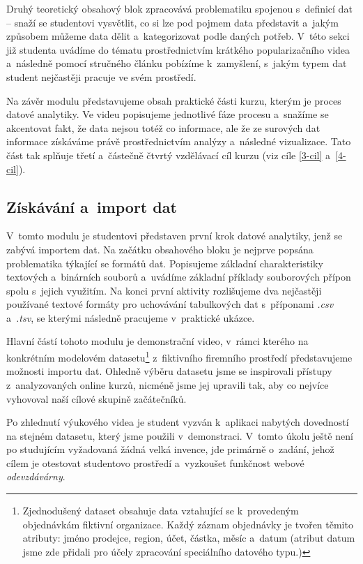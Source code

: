 Druhý teoretický obsahový blok zpracovává problematiku spojenou s~definicí dat -- snaží se studentovi vysvětlit, co si lze pod pojmem data představit a~jakým způsobem můžeme data dělit a~kategorizovat podle daných potřeb. V~této sekci již studenta uvádíme do tématu prostřednictvím krátkého popularizačního videa a~následně pomocí stručného článku pobízíme k~zamyšlení, s~jakým typem dat student nejčastěji pracuje ve svém prostředí.

Na závěr modulu představujeme obsah praktické části kurzu, kterým je proces datové analytiky. Ve videu popisujeme jednotlivé fáze procesu a~snažíme se akcentovat fakt, že data nejsou totéž co informace, ale že ze surových dat informace získáváme právě prostřednictvím analýzy a~následné vizualizace. Tato část tak splňuje třetí a~částečně čtvrtý vzdělávací cíl kurzu (viz cíle \ref{3-cil} a~\ref{4-cil}).

\hypertarget{zuxedskuxe1vuxe1nuxed-a-import-dat}{%
\subsection{Získávání a~import dat}\label{zuxedskuxe1vuxe1nuxed-a-import-dat}}

V~tomto modulu je studentovi představen první krok datové analytiky, jenž se zabývá importem dat. Na začátku obsahového bloku je nejprve popsána problematika týkající se formátů dat. Popisujeme základní charakteristiky textových a~binárních souborů a~uvádíme základní příklady souborových přípon spolu s~jejich využitím. Na konci první aktivity rozlišujeme dva nejčastěji používané textové formáty pro uchovávání tabulkových dat s~příponami \emph{.csv} a~\emph{.tsv}, se kterými následně pracujeme v~praktické ukázce.

Hlavní částí tohoto modulu je demonstrační video, v~rámci kterého na konkrétním modelovém datasetu\footnote{Zjednodušený dataset obsahuje data vztahující se k~provedeným objednávkám fiktivní organizace. Každý záznam objednávky je tvořen těmito atributy: jméno prodejce, region, účet, částka, měsíc a~datum (atribut datum jsme zde přidali pro účely zpracování speciálního datového typu.)} z~fiktivního firemního prostředí představujeme možnosti importu dat. Ohledně výběru datasetu jsme se inspirovali přístupy z~analyzovaných online kurzů, nicméně jsme jej upravili tak, aby co nejvíce vyhovoval naší cílové skupině začátečníků.

Po zhlednutí výukového videa je student vyzván k~aplikaci nabytých dovedností na stejném datasetu, který jsme použili v~demonstraci. V~tomto úkolu ještě není po studujícím vyžadovaná žádná velká invence, jde primárně o~zadání, jehož cílem je otestovat studentovo prostředí a~vyzkoušet funkčnost webové \emph{odevzdávárny}.

